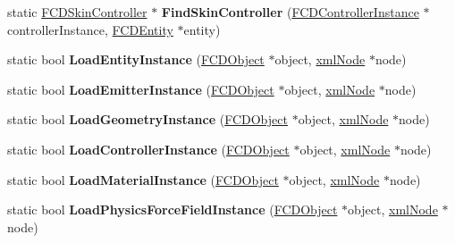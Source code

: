 \begin{DoxyCompactItemize}
\item 
\hypertarget{classFArchiveXML_a98489c2838a3d4eb96a4f04824081edb}{
static \hyperlink{classFCDSkinController}{FCDSkinController} $\ast$ {\bfseries FindSkinController} (\hyperlink{classFCDControllerInstance}{FCDControllerInstance} $\ast$controllerInstance, \hyperlink{classFCDEntity}{FCDEntity} $\ast$entity)}
\label{classFArchiveXML_a98489c2838a3d4eb96a4f04824081edb}

\item 
\hypertarget{classFArchiveXML_a900937020ac203ca5350ba3caadc7d28}{
static bool {\bfseries LoadEntityInstance} (\hyperlink{classFCDObject}{FCDObject} $\ast$object, \hyperlink{struct__xmlNode}{xmlNode} $\ast$node)}
\label{classFArchiveXML_a900937020ac203ca5350ba3caadc7d28}

\item 
\hypertarget{classFArchiveXML_ae91329905ec5e6b5a3e07b3ab6b0597c}{
static bool {\bfseries LoadEmitterInstance} (\hyperlink{classFCDObject}{FCDObject} $\ast$object, \hyperlink{struct__xmlNode}{xmlNode} $\ast$node)}
\label{classFArchiveXML_ae91329905ec5e6b5a3e07b3ab6b0597c}

\item 
\hypertarget{classFArchiveXML_a09864f68aba557a580a42d6b0091d121}{
static bool {\bfseries LoadGeometryInstance} (\hyperlink{classFCDObject}{FCDObject} $\ast$object, \hyperlink{struct__xmlNode}{xmlNode} $\ast$node)}
\label{classFArchiveXML_a09864f68aba557a580a42d6b0091d121}

\item 
\hypertarget{classFArchiveXML_a0a00cd269234eb419f4cd6a66854afad}{
static bool {\bfseries LoadControllerInstance} (\hyperlink{classFCDObject}{FCDObject} $\ast$object, \hyperlink{struct__xmlNode}{xmlNode} $\ast$node)}
\label{classFArchiveXML_a0a00cd269234eb419f4cd6a66854afad}

\item 
\hypertarget{classFArchiveXML_a8cacba7e220337fafb9af191769ef8ef}{
static bool {\bfseries LoadMaterialInstance} (\hyperlink{classFCDObject}{FCDObject} $\ast$object, \hyperlink{struct__xmlNode}{xmlNode} $\ast$node)}
\label{classFArchiveXML_a8cacba7e220337fafb9af191769ef8ef}

\item 
\hypertarget{classFArchiveXML_a1bdb975b6666fe700a24d6e31d1b02f6}{
static bool {\bfseries LoadPhysicsForceFieldInstance} (\hyperlink{classFCDObject}{FCDObject} $\ast$object, \hyperlink{struct__xmlNode}{xmlNode} $\ast$node)}
\label{classFArchiveXML_a1bdb975b6666fe700a24d6e31d1b02f6}


\end{DoxyCompactItemize}
